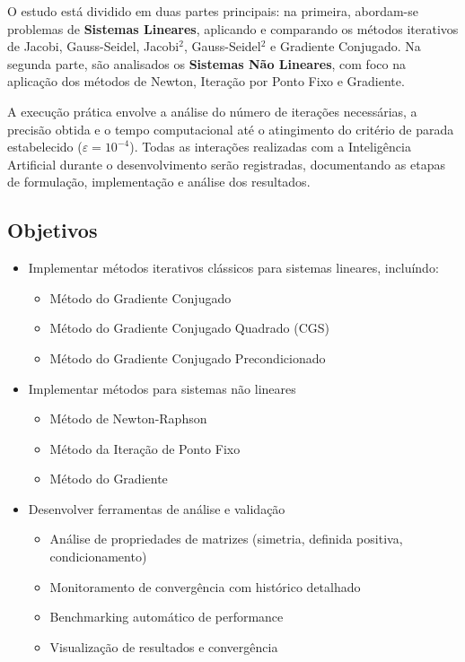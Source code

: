 \documentclass[12pt,a4paper]{article}
\begin{document}
O estudo está dividido em duas partes principais: na primeira, abordam-se problemas de \textbf{Sistemas Lineares}, aplicando e comparando os métodos iterativos de Jacobi, Gauss-Seidel, Jacobi$^2$, Gauss-Seidel$^2$ e Gradiente Conjugado. Na segunda parte, são analisados os \textbf{Sistemas Não Lineares}, com foco na aplicação dos métodos de Newton, Iteração por Ponto Fixo e Gradiente.

A execução prática envolve a análise do número de iterações necessárias, a precisão obtida e o tempo computacional até o atingimento do critério de parada estabelecido ($\varepsilon = 10^{-4}$). Todas as interações realizadas com a Inteligência Artificial durante o desenvolvimento serão registradas, documentando as etapas de formulação, implementação e análise dos resultados.

\subsection{Objetivos}

\begin{itemize}
    \item Implementar métodos iterativos clássicos para sistemas lineares, incluíndo:
    \begin{itemize}
        \item Método do Gradiente Conjugado
        \item Método do Gradiente Conjugado Quadrado (CGS)
        \item Método do Gradiente Conjugado Precondicionado
    \end{itemize}
    \item Implementar métodos para sistemas não lineares
    \begin{itemize}
        \item Método de Newton-Raphson
        \item Método da Iteração de Ponto Fixo
        \item Método do Gradiente
    \end{itemize}
    \item Desenvolver ferramentas de análise e validação
    \begin{itemize}
        \item Análise de propriedades de matrizes (simetria, definida positiva, condicionamento)
        \item Monitoramento de convergência com histórico detalhado
        \item Benchmarking automático de performance
        \item Visualização de resultados e convergência
    \end{itemize}
\end{itemize}
\end{document}
